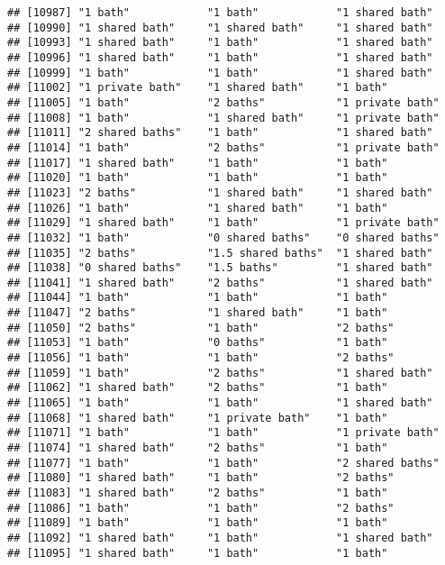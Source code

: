 \documentclass[
]{article}
\begin{document}
\begin{verbatim}
## [10987] "1 bath"            "1 bath"            "1 shared bath"    
## [10990] "1 shared bath"     "1 shared bath"     "1 shared bath"    
## [10993] "1 shared bath"     "1 bath"            "1 shared bath"    
## [10996] "1 shared bath"     "1 bath"            "1 shared bath"    
## [10999] "1 bath"            "1 bath"            "1 shared bath"    
## [11002] "1 private bath"    "1 shared bath"     "1 bath"           
## [11005] "1 bath"            "2 baths"           "1 private bath"   
## [11008] "1 bath"            "1 shared bath"     "1 private bath"   
## [11011] "2 shared baths"    "1 bath"            "1 shared bath"    
## [11014] "1 bath"            "2 baths"           "1 private bath"   
## [11017] "1 shared bath"     "1 bath"            "1 bath"           
## [11020] "1 bath"            "1 bath"            "1 bath"           
## [11023] "2 baths"           "1 shared bath"     "1 shared bath"    
## [11026] "1 bath"            "1 shared bath"     "1 bath"           
## [11029] "1 shared bath"     "1 bath"            "1 private bath"   
## [11032] "1 bath"            "0 shared baths"    "0 shared baths"   
## [11035] "2 baths"           "1.5 shared baths"  "1 shared bath"    
## [11038] "0 shared baths"    "1.5 baths"         "1 shared bath"    
## [11041] "1 shared bath"     "2 baths"           "1 shared bath"    
## [11044] "1 bath"            "1 bath"            "1 bath"           
## [11047] "2 baths"           "1 shared bath"     "1 bath"           
## [11050] "2 baths"           "1 bath"            "2 baths"          
## [11053] "1 bath"            "0 baths"           "1 bath"           
## [11056] "1 bath"            "1 bath"            "2 baths"          
## [11059] "1 bath"            "2 baths"           "1 shared bath"    
## [11062] "1 shared bath"     "2 baths"           "1 bath"           
## [11065] "1 bath"            "1 bath"            "1 shared bath"    
## [11068] "1 shared bath"     "1 private bath"    "1 bath"           
## [11071] "1 bath"            "1 bath"            "1 private bath"   
## [11074] "1 shared bath"     "2 baths"           "1 bath"           
## [11077] "1 bath"            "1 bath"            "2 shared baths"   
## [11080] "1 shared bath"     "1 bath"            "2 baths"          
## [11083] "1 shared bath"     "2 baths"           "1 bath"           
## [11086] "1 bath"            "1 bath"            "2 baths"          
## [11089] "1 bath"            "1 bath"            "1 bath"           
## [11092] "1 shared bath"     "1 bath"            "1 shared bath"    
## [11095] "1 shared bath"     "1 bath"            "1 bath"           

\end{verbatim}
\end{document}
